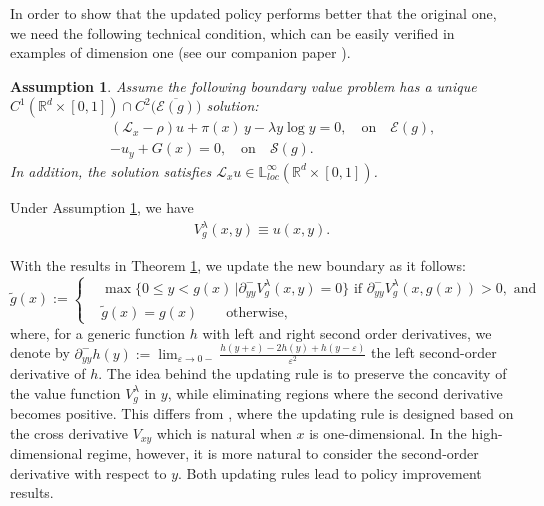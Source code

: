 \documentclass[11pt]{amsart}
\newtheorem{assumption}[theorem]{Assumption}
\theoremstyle{plain}
\numberwithin{equation}{section}
\begin{document}
In order to show that the updated policy performs better that the original one, we need the following technical condition, which can be easily verified in examples of dimension one (see our companion paper \cite{dianetti2026reinforcement}).
 \begin{assumption}
     \label{thm:property_g} 
    Assume the following  boundary value problem has a unique ${C}^{1}(\mathbb{R}^d\times [0,1])\cap{C}^{2}\big(\overline{\mathcal{E}(g)}\big)$ solution:
     \begin{eqnarray}
      &&(\mathcal{L}_x-\rho) u + \pi(x)\,y - \lambda y \log y =0,                   \quad \text{on} \quad\mathcal{E}(g), \label{eq:HJB_g_1}\\
     && -u_y +G(x)= 0, \quad \text{on}\quad \mathcal{S}(g).
  \end{eqnarray}
In addition, the solution satisfies $\mathcal L _x u\in \mathbb{L}_{loc}^{\infty}(\mathbb{R}^d \times[0,1])$. 
\end{assumption}





 Under Assumption \ref{thm:property_g}, we have   
\begin{eqnarray}
   V^\lambda_g(x,y) \equiv u(x,y). \label{eq:verification_thm}
\end{eqnarray}



With the results in Theorem \ref{thm:property_g}, we update the new boundary as it follows:
  \begin{equation}\label{eq:updated_policy}
    \widetilde{g}(x) :=
      \begin{cases}
       & \max \Big\{0\leq y< g(x)\,\Big| \partial^-_{yy} V^\lambda_{g}(x,y) = 0\Big\} \,\,\text{if} \,\, \partial^-_{yy} V^\lambda_{g}(x,g(x))> 0, \text{ and } \\
    &   \widetilde{g}(x) = g (x)  \qquad \text{otherwise,}  
      \end{cases}
  \end{equation}
where, for a generic function $h$ with left and right second order derivatives, we denote by $\partial_{yy}^- h(y) :=\lim_{\varepsilon\rightarrow 0-} \frac{h(y+\varepsilon)-2h(y)+ h(y-\varepsilon)}{\varepsilon^2}$ the left second-order derivative of $h$. The idea behind the updating rule is to preserve the concavity of the value function $V^\lambda_{g}$ in $y$, while eliminating regions where the second derivative becomes positive.  This differs from  \cite{dianetti2026reinforcement}, where the updating rule is designed based on the cross derivative $V_{xy}$ which is natural when $x$ is one-dimensional. In the high-dimensional regime, however, it is more natural to consider the second-order derivative with respect to $y$. Both updating rules lead to policy improvement results. 
\end{document}
